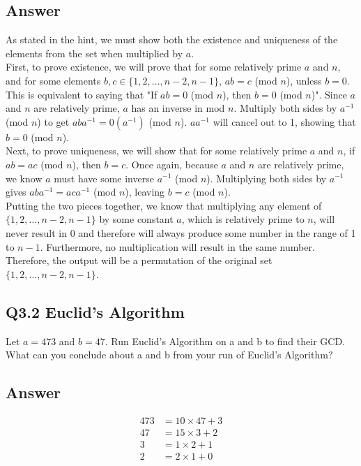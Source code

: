 \documentclass{article}
\begin{document}
\subsection*{Answer}
As stated in the hint, we must show both the existence and uniqueness of the elements from the set when multiplied by $a$.
\\ First, to prove existence, we will prove that for some relatively prime $a$ and $n$, and for some elements $b,c\in \{1,2,...,n-2,n-1\}$,  $ab=c$ (mod $n$), unless $b=0$. This is equivalent to saying that "If $ab=0$ (mod $n$), then $b=0$ (mod $n$)". Since $a$ and $n$ are relatively prime, $a$ has an inverse in mod $n$. Multiply both sides by $a^{-1}$ (mod $n$) to get $aba^{-1}=0(a^{-1})$ (mod $n$). $aa^{-1}$ will cancel out to 1, showing that $b=0$ (mod $n$).
\\ Next, to prove uniqueness, we will show that for some relatively prime $a$ and $n$, if $ab=ac$ (mod $n$), then $b=c$. Once again, because $a$ and $n$ are relatively prime, we know $a$ must have some inverse $a^{-1}$ (mod $n$). Multiplying both sides by $a^{-1}$ gives $aba^{-1}=aca^{-1}$ (mod $n$), leaving $b=c$ (mod $n$).
\\ Putting the two pieces together, we know that multiplying any element of $\{1,2,...,n-2,n-1\}$ by some constant $a$, which is relatively prime to $n$, will never result in 0 and therefore will always produce some number in the range of 1 to $n-1$. Furthermore, no multiplication will result in the same number. Therefore, the output will be a permutation of the original set $\{1,2,...,n-2,n-1\}$.
\newpage
\subsection*{Q3.2 Euclid's Algorithm}

Let $a = 473$ and $b = 47$. Run Euclid's Algorithm on a and b to find their GCD. What can you conclude about a and b from your run of Euclid's Algorithm?

\subsection*{Answer}

\begin{align*}
473 &= 10 \times 47 + 3 \\
47 &= 15 \times 3 + 2 \\
3 &= 1 \times 2 + 1 \\
2 &= 2 \times 1 + 0 \\
\end{align*}
\end{document}
